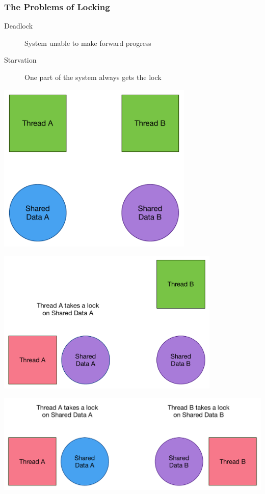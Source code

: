 \documentclass[pdftex]{beamer} %
\begin{document}
\begin{frame}
  \frametitle{The Problems of Locking }
  \begin{description}
  \item[Deadlock] System unable to make forward progress
  \item[Starvation] One part of the system always gets the lock
  \end{description}
\end{frame}

\begin{frame}
\centering
      \includegraphics[width=0.7\textwidth]{../../figures/deadlock1.pdf}
\end{frame}

\begin{frame}
\centering
      \includegraphics[width=0.8\textwidth]{../../figures/deadlock2.pdf}
\end{frame}

\begin{frame}
\centering
      \includegraphics[width=\textwidth]{../../figures/deadlock3.pdf}
\end{frame}
\end{document}

